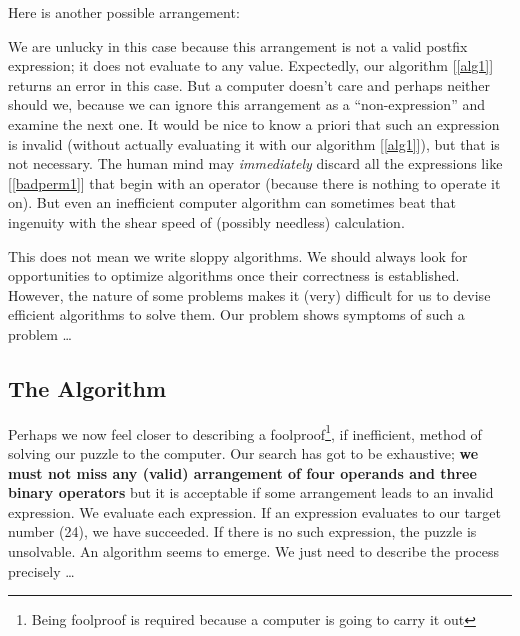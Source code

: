 \documentclass[english,smartquotes]{hgbarticle}
\newenvironment{arrangement}{\captionsetup{type=mytype}}{}
\begin{document}
Here is another possible arrangement:

\begin{arrangement}
\vspace{2mm}
\centering
{}
\label{badperm1}
\end{arrangement}

We are unlucky in this case because this arrangement is not a valid postfix expression; it does not evaluate to any value. Expectedly, our algorithm [\ref{alg1}] returns an error in this case. But a computer doesn't care and perhaps neither should we, because we can ignore this arrangement as a ``non-expression'' and examine the next one. It would be nice to know a priori that such an expression is invalid (without actually evaluating it with our algorithm [\ref{alg1}]), but that is not necessary. The human mind may \emph{immediately} discard all the expressions like [\ref{badperm1}] that begin with an operator (because there is nothing to operate it on). But even an inefficient computer algorithm can sometimes beat that ingenuity with the shear speed of (possibly needless) calculation. 

This does not mean we write sloppy algorithms. We should always look for opportunities to optimize algorithms once their correctness is established. However, the nature of some problems makes it (very) difficult for us to devise efficient algorithms to solve them. Our problem shows symptoms of such a problem \dots

\subsection{The Algorithm}
Perhaps we now feel closer to describing a foolproof\footnote{Being foolproof is required because a computer is going to carry it out}, if inefficient, method of solving our puzzle to the computer. Our search has got to be exhaustive; \textbf{we must not miss any (valid) arrangement of four operands and three binary operators} but it is acceptable if some arrangement leads to an invalid expression. We evaluate each expression. If an expression evaluates to our target number (24), we have succeeded. If there is no such expression, the puzzle is unsolvable. An algorithm seems to emerge. We just need to describe the process precisely \dots
\end{document}
